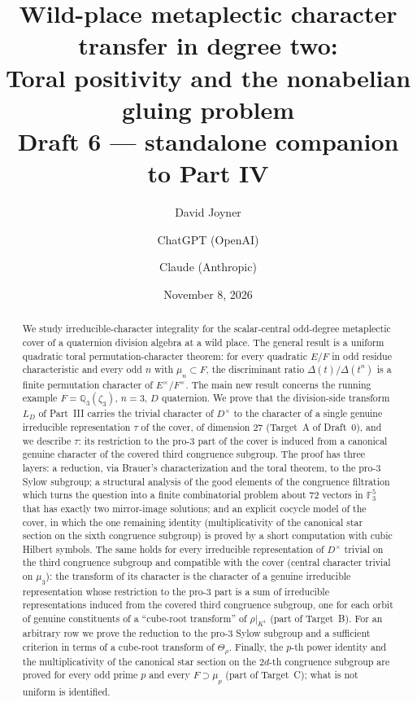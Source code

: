 \documentclass[11pt]{article}
\title{Wild-place metaplectic character transfer in degree two:\\
Toral positivity and the nonabelian gluing problem\\[0.4em]
\normalsize Draft 6 --- standalone companion to Part IV}
\author{David Joyner \and ChatGPT (OpenAI) \and Claude (Anthropic)}
\date{November 8, 2026}
\newcommand{\Q}{\mathbb Q}
\newcommand{\Fq}{\mathbb F}
\theoremstyle{plain}
\theoremstyle{definition}
\begin{document}
\maketitle
\begin{abstract}
We study irreducible-character integrality for the scalar-central
odd-degree metaplectic cover of a quaternion division algebra at a
wild place.  The general result is a uniform quadratic toral
permutation-character theorem: for every quadratic $E/F$ in odd
residue characteristic and every odd $n$ with $\mu_n\subset F$, the
discriminant ratio $\Delta(t)/\Delta(t^n)$ is a finite permutation
character of $E^\times/F^\times$.  The main new result concerns the
running example $F=\Q_3(\zeta_3)$, $n=3$, $D$ quaternion.  We prove
that the division-side transform $L_D$ of Part~III carries the
trivial character of $D^\times$ to the character of a single genuine
irreducible representation $\tau$ of the cover, of dimension $27$
(Target~A of Draft~0), and we describe $\tau$: its restriction to the
pro-$3$ part of the cover is induced from a canonical genuine
character of the covered third congruence subgroup.  The proof has
three layers: a reduction, via Brauer's characterization and the
toral theorem, to the pro-$3$ Sylow subgroup; a structural analysis
of the good elements of the congruence filtration which turns the
question into a finite combinatorial problem about $72$ vectors in
$\Fq_3^5$ that has exactly two mirror-image solutions; and an
explicit cocycle model of the cover, in which the one remaining
identity (multiplicativity of the canonical star section on the sixth
congruence subgroup) is proved by a short computation with cubic
Hilbert symbols.  The same holds for every irreducible representation of $D^\times$
trivial on the third congruence subgroup and compatible with the cover
(central character trivial on $\mu_3$): the transform of its
character is the character of a genuine irreducible representation
whose restriction to the pro-$3$ part is a sum of irreducible
representations induced from the covered third congruence subgroup,
one for each orbit of genuine constituents of a ``cube-root transform''
of $\rho|_{K^1}$ (part of Target~B).  For an arbitrary row
we prove the reduction to the pro-$3$ Sylow subgroup and a sufficient
criterion in terms of a cube-root transform of $\Theta_\rho$.  Finally,
the $p$-th power identity and the multiplicativity of the canonical star
section on the $2d$-th congruence subgroup are proved for every odd prime
$p$ and every $F\supset\mu_p$ (part of Target~C); what is not uniform is
identified.
\end{abstract}
\tableofcontents
\end{document}
